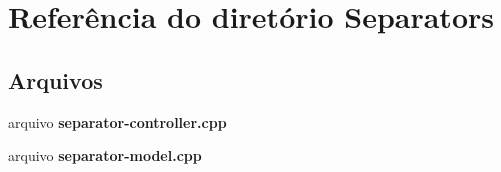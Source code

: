 \section{Referência do diretório Separators}
\label{dir_54bef72614174dcecc02fcdaa45dd054}
\subsection*{Arquivos}
\begin{DoxyCompactItemize}
\item 
arquivo {\bf separator-\/controller.\+cpp}
\item 
arquivo {\bf separator-\/model.\+cpp}
\end{DoxyCompactItemize}
